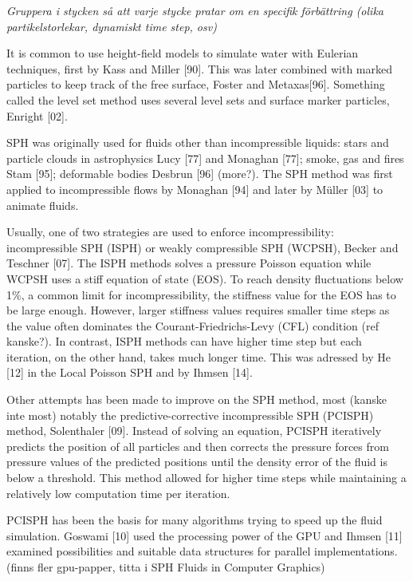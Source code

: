 \documentclass[../../main.tex]{subfiles}
\begin{document}
\textit{Gruppera i stycken så att varje stycke pratar om en specifik förbättring (olika partikelstorlekar, dynamiskt time step, osv)}



It is common to use height-field models to simulate water with Eulerian techniques, first by Kass and Miller [90]. This was later combined with marked particles to keep track of the free surface, Foster and Metaxas[96]. Something called the level set method uses several level sets and surface marker particles, Enright [02]. 

SPH was originally used for fluids other than incompressible liquids: stars and particle clouds in astrophysics Lucy [77] and Monaghan [77]; smoke, gas and fires Stam [95]; deformable bodies Desbrun [96] (more?). The SPH method was first applied to incompressible flows by Monaghan [94] and later by Müller [03] to animate fluids. 

Usually, one of two strategies are used to enforce incompressibility: incompressible SPH (ISPH) or weakly compressible SPH (WCPSH), Becker and Teschner [07]. The ISPH methods solves a pressure Poisson equation while WCPSH uses a stiff equation of state (EOS). To reach density fluctuations below 1\%, a common limit for incompressibility, the stiffness value for the EOS has to be large enough. However, larger stiffness values requires smaller time steps as the value often dominates the Courant-Friedrichs-Levy (CFL) condition (ref kanske?). In contrast, ISPH methods can have higher time step but each iteration, on the other hand, takes much longer time. This was adressed by He [12] in the Local Poisson SPH and by Ihmsen [14]. 

Other attempts has been made to improve on the SPH method, most (kanske inte most) notably the predictive-corrective incompressible SPH (PCISPH) method, Solenthaler [09]. Instead of solving an equation, PCISPH iteratively predicts the position of all particles and then corrects the pressure forces from pressure values of the predicted positions until the density error of the fluid is below a threshold. This method allowed for higher time steps while maintaining a relatively low computation time per iteration. 

PCISPH has been the basis for many algorithms trying to speed up the fluid simulation. Goswami [10] used the processing power of the GPU and Ihmsen [11] examined possibilities and suitable data structures for parallel implementations. (finns fler gpu-papper, titta i SPH Fluids in Computer Graphics)
\end{document}
